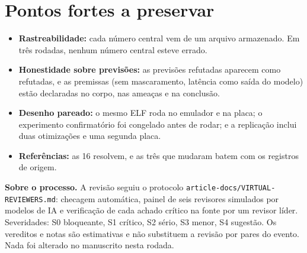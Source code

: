 \documentclass[10pt,a4paper]{article}
\begin{document}
\section{Pontos fortes a preservar}
\begin{itemize}
\item \textbf{Rastreabilidade:} cada número central vem de um arquivo armazenado. Em três rodadas, nenhum número central esteve errado.
\item \textbf{Honestidade sobre previsões:} as previsões refutadas aparecem como refutadas, e as premissas (sem mascaramento, latência como saída do modelo) estão declaradas no corpo, nas ameaças e na conclusão.
\item \textbf{Desenho pareado:} o mesmo ELF roda no emulador e na placa; o experimento confirmatório foi congelado antes de rodar; e a replicação inclui duas otimizações e uma segunda placa.
\item \textbf{Referências:} as 16 resolvem, e as três que mudaram batem com os registros de origem.
\end{itemize}

\vfill
{\footnotesize\color{muted}
\textbf{Sobre o processo.} A revisão seguiu o protocolo \texttt{article-docs/VIRTUAL-REVIEWERS.md}: checagem automática, painel de seis revisores simulados por modelos de IA e verificação de cada achado crítico na fonte por um revisor líder. Severidades: S0 bloqueante, S1 crítico, S2 sério, S3 menor, S4 sugestão. Os vereditos e notas são estimativas e não substituem a revisão por pares do evento. Nada foi alterado no manuscrito nesta rodada.}
\end{document}
